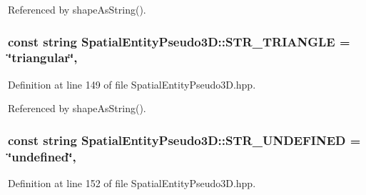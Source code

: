 Referenced by shape\-As\-String().

\hypertarget{classmultiscale_1_1analysis_1_1SpatialEntityPseudo3D_a8ad67f0073da808ad1badedf2e613ed3}{
\subsubsection[{S\-T\-R\-\_\-\-T\-R\-I\-A\-N\-G\-L\-E}]{\setlength{\rightskip}{0pt plus 5cm}const string Spatial\-Entity\-Pseudo3\-D\-::\-S\-T\-R\-\_\-\-T\-R\-I\-A\-N\-G\-L\-E = \char`\"{}triangular\char`\"{}\hspace{0.3cm}{\ttfamily [static]}, {\ttfamily [protected]}}}\label{classmultiscale_1_1analysis_1_1SpatialEntityPseudo3D_a8ad67f0073da808ad1badedf2e613ed3}


Definition at line 149 of file Spatial\-Entity\-Pseudo3\-D.\-hpp.



Referenced by shape\-As\-String().

\hypertarget{classmultiscale_1_1analysis_1_1SpatialEntityPseudo3D_ae4e33ad9bcad430b929b601c5571a6fd}{
\subsubsection[{S\-T\-R\-\_\-\-U\-N\-D\-E\-F\-I\-N\-E\-D}]{\setlength{\rightskip}{0pt plus 5cm}const string Spatial\-Entity\-Pseudo3\-D\-::\-S\-T\-R\-\_\-\-U\-N\-D\-E\-F\-I\-N\-E\-D = \char`\"{}undefined\char`\"{}\hspace{0.3cm}{\ttfamily [static]}, {\ttfamily [protected]}}}\label{classmultiscale_1_1analysis_1_1SpatialEntityPseudo3D_ae4e33ad9bcad430b929b601c5571a6fd}


Definition at line 152 of file Spatial\-Entity\-Pseudo3\-D.\-hpp.



